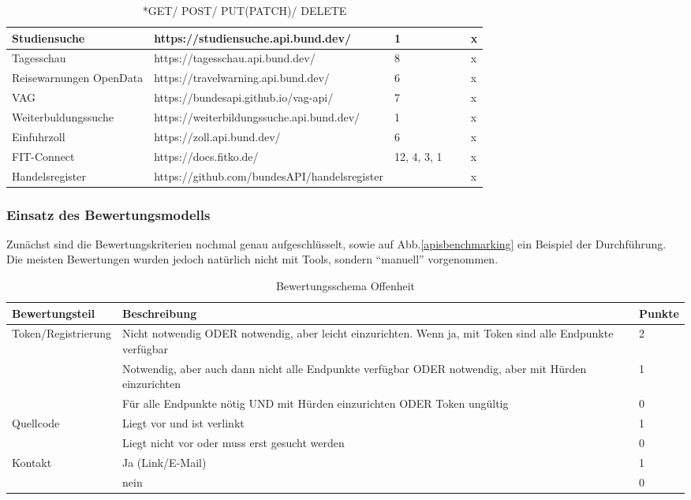 \documentclass[notitlepage, hidelinks]{article}
\begin{document}
\begin{table}[H]
{\begin{tabular}{|l|l|l|l|l|}
        Studiensuche & https://studiensuche.api.bund.dev/ & 1 & ~ & x \\ \hline
        Tagesschau & https://tagesschau.api.bund.dev/ & 8 & ~ & x \\ \hline
        Reisewarnungen OpenData & https://travelwarning.api.bund.dev/ & 6 & ~ & x \\ \hline
        VAG & https://bundesapi.github.io/vag-api/ & 7 & ~ & x \\ \hline
        Weiterbuldungssuche & https://weiterbildungssuche.api.bund.dev/ & 1 & ~ & x \\ \hline
        Einfuhrzoll & https://zoll.api.bund.dev/ & 6 & ~ & x \\ \hline
        FIT-Connect & https://docs.fitko.de/ & 12, 4, 3, 1 & ~ & x \\ \hline
        Handelsregister & https://github.com/bundesAPI/handelsregister & ~ & ~ & x \\ \hline
    \end{tabular}}
    \caption{*GET/ POST/ PUT(PATCH)/ DELETE}
\end{table}

\newpage

\subsubsection{Einsatz des Bewertungsmodells}
Zunächst sind die Bewertungskriterien nochmal genau aufgeschlüsselt, sowie auf Abb.\ref{apisbenchmarking} ein Beispiel der Durchführung. Die meisten Bewertungen wurden jedoch natürlich nicht mit Tools, sondern ``manuell'' vorgenommen.


\begin{table}[H]
\begin{center}
\begin{tabular}{|p{3.6cm}|p{8.5cm}|p{2.5cm}|}
\hline
\textbf{Bewertungsteil} & \textbf{Beschreibung} & \textbf{Punkte}\\ \hline
Token/Registrierung & Nicht notwendig ODER notwendig, aber leicht einzurichten. Wenn ja, mit Token sind alle Endpunkte verfügbar & 2\\ \hline
& Notwendig, aber auch dann nicht alle Endpunkte verfügbar ODER notwendig, aber mit Hürden einzurichten & 1\\ \hline
& Für alle Endpunkte nötig UND mit Hürden einzurichten ODER Token ungültig & 0\\ \hline
Quellcode & Liegt vor und ist verlinkt & 1\\ \hline
& Liegt nicht vor oder muss erst gesucht werden & 0\\ \hline
Kontakt & Ja (Link/E-Mail) & 1 \\ \hline
& nein & 0 \\ \hline
\end{tabular}
\caption{Bewertungsschema Offenheit}
\label{Offenheit}
\end{center}
\end{table}
\end{document}
